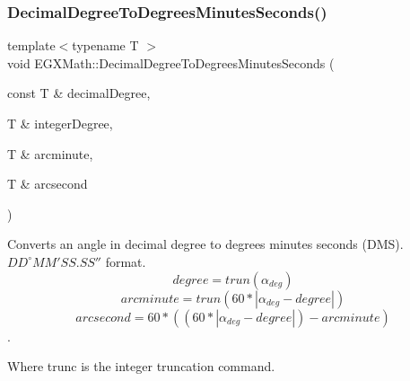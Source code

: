 \subsubsection{\texorpdfstring{Decimal\+Degree\+To\+Degrees\+Minutes\+Seconds()}{DecimalDegreeToDegreesMinutesSeconds()}}
{\footnotesize\ttfamily template$<$typename T $>$ \\
void E\+G\+X\+Math\+::\+Decimal\+Degree\+To\+Degrees\+Minutes\+Seconds (\begin{DoxyParamCaption}\item[{const T \&}]{decimal\+Degree,  }\item[{T \&}]{integer\+Degree,  }\item[{T \&}]{arcminute,  }\item[{T \&}]{arcsecond }\end{DoxyParamCaption})}



Converts an angle in decimal degree to degrees minutes seconds (D\+MS). ${DD}^{\circ}{MM}'{SS.SS}''$ format. \[degree=trun(\alpha_{deg})\] \[arcminute=trun(60 * |\alpha_{deg} - degree|)\] \[arcsecond=60 * ((60 * |\alpha_{deg} - degree|)-arcminute)\]. 

Where trunc is the integer truncation command.

